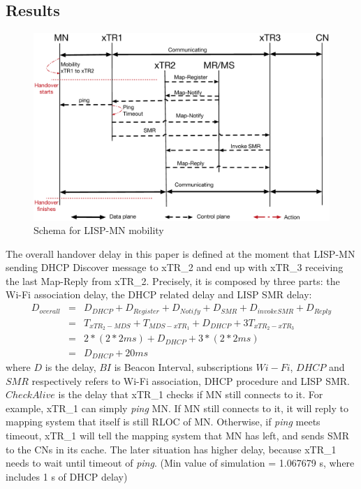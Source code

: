\subsection{Results}
\label{sec:ns3_results_xTR}

\begin{figure}[!th]
	\centering
	\includegraphics[width=\textwidth]{Pics/Mobility_xTR_schema_SMR_simplify}
	\caption{Schema for LISP-MN mobility}
	\label{sim_schema}
\end{figure}

The overall handover delay in this paper is defined at the moment that LISP-MN sending DHCP Discover message to xTR\_2 and end up with xTR\_3 receiving the last Map-Reply from xTR\_2. Precisely, it is composed by three parts: the Wi-Fi association delay, the DHCP related delay and LISP SMR delay:
\begin{eqnarray}
D_{overall} &=& D_{DHCP} + D_{Register} + D_{Notify} + D_{SMR} + D_{invokeSMR} + D_{Reply} \nonumber \\
&=& T_{xTR_2-MDS} + T_{MDS-xTR_1} + D_{DHCP} + 3T_{xTR_2-xTR_3} \nonumber \\
&=& 2* (2*2ms) + D_{DHCP} + 3*(2*2ms) \nonumber \\
&=& D_{DHCP} + 20 ms
\end{eqnarray}
where $D$ is the delay, $BI$ is Beacon Interval, subscriptions $Wi-Fi$, $DHCP$ and $SMR$ respectively refers to Wi-Fi association, DHCP procedure and LISP SMR. $CheckAlive$ is the delay that xTR\_1 checks if MN still connects to it. For example, xTR\_1 can simply \emph{ping} MN. If MN still connects to it, it will reply to mapping system that itself is still RLOC of MN. Otherwise, if \emph{ping} meets timeout, xTR\_1 will tell the mapping system that MN has left, and sends SMR to the CNs in its cache. The later situation has higher delay, because xTR\_1 needs to wait until timeout of \emph{ping}. (Min value of simulation = 1.067679 s, where includes 1 s of DHCP delay)

